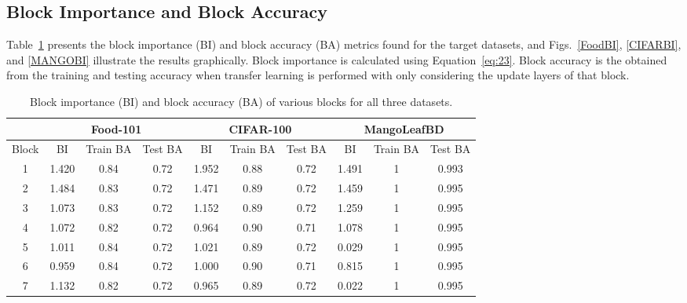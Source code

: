 \documentclass[a4paper,fleqn]{cas-sc}
\begin{document}
\subsection{Block Importance and Block Accuracy}
Table~\ref{tab:BI_BA_alldata} presents the block importance (BI) and block accuracy (BA) metrics found for the target datasets, and %
Figs.~\ref{FoodBI}, \ref{CIFARBI}, and \ref{MANGOBI} illustrate the results graphically. Block importance is calculated using Equation~\ref{eq:23}. Block accuracy is the obtained from the training and testing accuracy  when transfer learning is performed with only considering the update layers of that block.

\begin{table}[width=\linewidth,cols=4,pos=h]
\caption{Block importance (BI) and block accuracy (BA) of various blocks for all three datasets.}
\label{tab:BI_BA_alldata}
\begin{tabular*}{\tblwidth}{ c | c | c | c | c | c | c | c | c | c }
\toprule
& \multicolumn{3}{c|}{Food-101}  & \multicolumn{3}{c|}{CIFAR-100} & \multicolumn{3}{c}{MangoLeafBD} \\
\toprule
 Block & BI & Train BA & Test  BA & BI & Train  BA & Test  BA & BI & Train  BA & Test  BA \\
\midrule
1 & 1.420 & 0.84 & 0.72 & 1.952 & 0.88 & 0.72 & 1.491 & 1 & 0.993\\
2 & 1.484 & 0.83 & 0.72 & 1.471 & 0.89 & 0.72 & 1.459 & 1 & 0.995\\
3 & 1.073 & 0.83 & 0.72 & 1.152 & 0.89 & 0.72 & 1.259 & 1 & 0.995\\
4 & 1.072 & 0.82 & 0.72 & 0.964 & 0.90 & 0.71 & 1.078 & 1 & 0.995 \\
5 & 1.011 & 0.84 & 0.72 & 1.021 & 0.89 & 0.72 & 0.029 & 1 & 0.995 \\
6 & 0.959 & 0.84 & 0.72 & 1.000 & 0.90 & 0.71 & 0.815 & 1 & 0.995 \\
7 & 1.132 & 0.82 & 0.72 & 0.965 & 0.89 & 0.72 & 0.022 & 1 & 0.995 \\
\bottomrule
\end{tabular*}
\end{table}

\begin{comment}
\begin{figure}%
    \centering
    \subfloat[\centering FOOD-100 dataset]{\texttt{[image: figs/chart\_food.png]}}%
    \qquad
    \subfloat[\centering CIFAR-100 dataset]{{\texttt{[image: figs/chart\_cifar.png]} }}%
    \qquad
    \subfloat[\centering MangoLeafBD dataset]{{\texttt{[image: figs/chart\_mango.png]} }}%
    \caption{ Block importance (BI) and block accuracy (BA) of various blocks for different datasets.}%
    \label{fig:BA_BI}%
\end{figure}
\end{comment}
\end{document}
